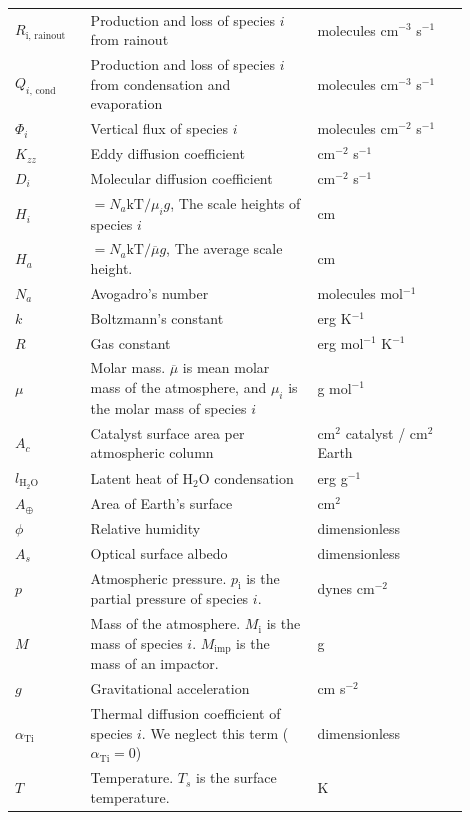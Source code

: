 \begin{spacing}{1.0}
\begin{center}
\begin{tabularx}{\linewidth}{p{0.15\linewidth} | p{0.45\linewidth} | p{0.3\linewidth}}
  $R_{\text{i, rainout}}$ & Production and loss of species $i$ from rainout & molecules cm$^{-3}$ s$^{-1}$
  \\
  $Q_{i\text{, cond}}$ & Production and loss of species $i$ from condensation and evaporation & molecules cm$^{-3}$ s$^{-1}$
  \\
  $\Phi_{i}$ & Vertical flux of species $i$ & molecules cm$^{-2}$ s$^{-1}$ 
  \\
  $K_{zz}$ & Eddy diffusion coefficient & cm$^{-2}$ s$^{-1}$ 
  \\
  $D_{i}$ & Molecular diffusion coefficient & cm$^{-2}$ s$^{-1}$ 
  \\
  $H_{i}$ & $= N_{a}\text{kT}\text{/}\mu_{i}g$, The scale heights of species $i$ & cm 
  \\
  $H_{a}$ & $= N_{a}\text{kT}\text{/}\overline{\mu}g$, The average scale height. & cm 
  \\
  $N_{a}$ & Avogadro's number & molecules mol$^{-1}$ 
  \\
  $k$ & Boltzmann's constant & erg K$^{-1}$ 
  \\
  $R$ & Gas constant & erg mol$^{-1}$ K$^{-1}$ 
  \\
  $\mu$ & Molar mass. $\overline{\mu}$ is mean molar mass of the atmosphere, and $\mu_{i}$ is the molar mass of species $i$ & g mol$^{-1}$ 
  \\
  $A_c$ & Catalyst surface area per atmospheric column & cm$^2$ catalyst / cm$^2$ Earth
  \\
  $l_\mathrm{H_2O}$ & Latent heat of H$_2$O condensation & erg g$^{-1}$ 
  \\
  $A_\oplus$ & Area of Earth's surface & cm$^2$
  \\
  $\phi$ & Relative humidity & dimensionless
  \\
  $A_s$ & Optical surface albedo & dimensionless
  \\
  $p$ & Atmospheric pressure. $p_\mathrm{i}$ is the partial pressure of species $i$. & dynes cm$^{-2}$ 
  \\
  $M$ & Mass of the atmosphere. $M_\mathrm{i}$ is the mass of species $i$. $M_\mathrm{imp}$ is the mass of an impactor. & g
  \\
  $g$ & Gravitational acceleration & cm s$^{-2}$ 
  \\
  $\alpha_{\text{Ti}}$ & Thermal diffusion coefficient of species $i$. We neglect this term ($\alpha_{\text{Ti}} = 0$) & dimensionless
  \\
  $T$ & Temperature. $T_s$ is the surface temperature. & K 
  \\
  \hline
  \end{tabularx}
\end{center}
\end{spacing}

